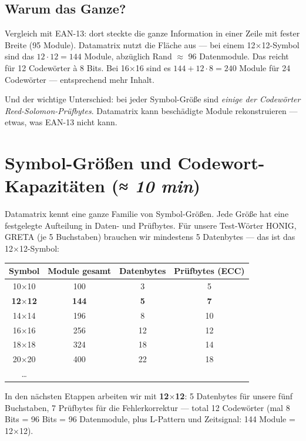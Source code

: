\subsection*{Warum das Ganze?}

Vergleich mit EAN-13: dort steckte die ganze Information in einer
Zeile mit fester Breite (95 Module). Datamatrix nutzt die Fläche aus
— bei einem 12$\times$12-Symbol sind das $12 \cdot 12 = 144$ Module,
abzüglich Rand $\approx$ 96 Datenmodule. Das reicht für 12 Codewörter à
8 Bits. Bei 16$\times$16 sind es $144 + 12 \cdot 8 = 240$ Module für
24 Codewörter — entsprechend mehr Inhalt.

Und der wichtige Unterschied: bei jeder Symbol-Größe sind \emph{einige
der Codewörter Reed-Solomon-Prüfbytes}. Datamatrix kann beschädigte
Module rekonstruieren — etwas, was EAN-13 nicht kann.

\section{Symbol-Größen und Codewort-Kapazitäten \normalfont(\textit{≈ 10 min})}

Datamatrix kennt eine ganze Familie von Symbol-Größen. Jede Größe hat
eine festgelegte Aufteilung in Daten- und Prüfbytes. Für unsere
Test-Wörter HONIG, GRETA (je 5 Buchstaben) brauchen wir mindestens 5
Datenbytes — das ist das 12$\times$12-Symbol:

\begin{center}
\small
\begin{tabular}{c c c c}
\toprule
\textbf{Symbol} & \textbf{Module gesamt} & \textbf{Datenbytes} & \textbf{Prüfbytes (ECC)} \\
\midrule
10$\times$10  & 100  & 3   & 5   \\
\textbf{12$\times$12}  & \textbf{144}  & \textbf{5}   & \textbf{7}   \\
14$\times$14  & 196  & 8   & 10  \\
16$\times$16  & 256  & 12  & 12  \\
18$\times$18  & 324  & 18  & 14  \\
20$\times$20  & 400  & 22  & 18  \\
\dots         &      &     &     \\
\bottomrule
\end{tabular}
\end{center}

In den nächsten Etappen arbeiten wir mit \textbf{12$\times$12}: 5
Datenbytes für unsere fünf Buchstaben, 7 Prüfbytes für die
Fehlerkorrektur — total 12 Codewörter (mal 8 Bits = 96 Bits =
96 Datenmodule, plus L-Pattern und Zeitsignal: 144 Module = 12$\times$12).

